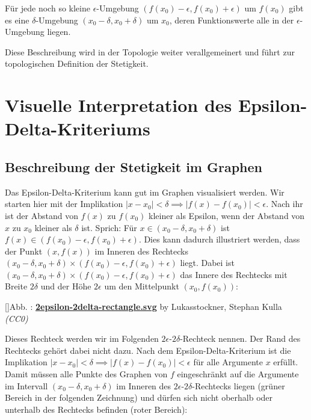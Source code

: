 \documentclass[fontsize=9pt,
               parskip=half-,
               DIV=14,
               listof=chapterentry,
               tocflat]{scrbook}
\newcounter{imagelabel}
\begin{document}
\begin{importantparagraph*}
Für jede noch so kleine $\epsilon $-Umgebung $(f(x_{0})-\epsilon ,f(x_{0})+\epsilon )$ um $f(x_{0})$ gibt es eine $\delta $-Umgebung $(x_{0}-\delta ,x_{0}+\delta )$ um $x_{0}$, deren Funktionswerte alle in der $\epsilon $-Umgebung liegen.

\end{importantparagraph*}

Diese Beschreibung wird in der Topologie weiter verallgemeinert und führt zur topologischen Definition der Stetigkeit.

\section{Visuelle Interpretation des Epsilon-Delta-Kriteriums}

\subsection{Beschreibung der Stetigkeit im Graphen}

Das Epsilon-Delta-Kriterium kann gut im Graphen visualisiert werden. Wir starten hier mit der Implikation $|x-x_{0}|<\delta \implies |f(x)-f(x_{0})|<\epsilon $. Nach ihr ist der Abstand von $f(x)$ zu $f(x_{0})$ kleiner als Epsilon, wenn der Abstand von $x$ zu $x_{0}$ kleiner als $\delta $ ist. Sprich: Für $x\in (x_{0}-\delta ,x_{0}+\delta )$ ist $f(x)\in (f(x_{0})-\epsilon ,f(x_{0})+\epsilon )$. Dies kann dadurch illustriert werden, dass der Punkt $(x,f(x))$ im Inneren des Rechtecks $(x_{0}-\delta ,x_{0}+\delta )\times (f(x_{0})-\epsilon ,f(x_{0})+\epsilon )$ liegt. Dabei ist $(x_{0}-\delta ,x_{0}+\delta )\times (f(x_{0})-\epsilon ,f(x_{0})+\epsilon )$ das Innere des Rechtecks mit Breite $2\delta $ und der Höhe $2\epsilon $ um den Mittelpunkt $(x_{0},f(x_{0}))$:

[]{Abb. : \protect\href{https://commons.wikimedia.org/wiki/File:2epsilon-2delta-rectangle.svg}{\textbf{2epsilon\allowbreak-2delta\allowbreak-rectangle.svg}} by Lukasstockner, Stephan Kulla \textit{(CC0)}}\begin{center}
\end{center}

Dieses Rechteck werden wir im Folgenden $2\epsilon $-$2\delta $-Rechteck nennen. Der Rand des Rechtecks gehört dabei nicht dazu. Nach dem Epsilon-Delta-Kriterium ist die Implikation $|x-x_{0}|<\delta \implies |f(x)-f(x_{0})|<\epsilon $ für alle Argumente $x$ erfüllt. Damit müssen alle Punkte des Graphen von $f$ eingeschränkt auf die Argumente im Intervall $(x_{0}-\delta ,x_{0}+\delta )$ im Inneren des $2\epsilon $-$2\delta $-Rechtecks liegen (grüner Bereich in der folgenden Zeichnung) und dürfen sich nicht oberhalb oder unterhalb des Rechtecks befinden (roter Bereich):
\end{document}
